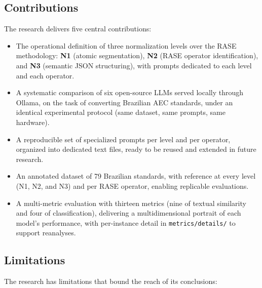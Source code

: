 \documentclass[a4paper,fleqn]{cas-sc}
\begin{document}
\subsection{Contributions}

The research delivers five central contributions:

\begin{itemize}
    \item The operational definition of three normalization levels over the RASE methodology: \textbf{N1} (atomic segmentation), \textbf{N2} (RASE operator identification), and \textbf{N3} (semantic JSON structuring), with prompts dedicated to each level and each operator.
    \item A systematic comparison of six open-source LLMs served locally through Ollama, on the task of converting Brazilian AEC standards, under an identical experimental protocol (same dataset, same prompts, same hardware).
    \item A reproducible set of specialized prompts per level and per operator, organized into dedicated text files, ready to be reused and extended in future research.
    \item An annotated dataset of 79 Brazilian standards, with reference at every level (N1, N2, and N3) and per RASE operator, enabling replicable evaluations.
    \item A multi-metric evaluation with thirteen metrics (nine of textual similarity and four of classification), delivering a multidimensional portrait of each model's performance, with per-instance detail in \texttt{metrics/details/} to support reanalyses.
\end{itemize}

\subsection{Limitations}

The research has limitations that bound the reach of its conclusions:
\end{document}
